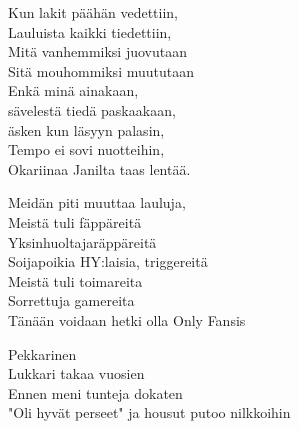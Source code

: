 Kun lakit päähän vedettiin,\\
Lauluista kaikki tiedettiin,\\
Mitä vanhemmiksi juovutaan\\
Sitä mouhommiksi muututaan\\
Enkä minä ainakaan,\\
sävelestä tiedä paskaakaan,\\
äsken kun läsyyn palasin,\\
Tempo ei sovi nuotteihin,\\
Okariinaa Janilta taas lentää.

Meidän piti muuttaa lauluja,\\
Meistä tuli fäppäreitä\\
Yksinhuoltajaräppäreitä\\
Soijapoikia HY:laisia, triggereitä\\
Meistä tuli toimareita\\
Sorrettuja gamereita\\
Tänään voidaan hetki olla Only Fansis

Pekkarinen\\
Lukkari takaa vuosien\\
Ennen meni tunteja dokaten\\
"Oli hyvät perseet" ja housut putoo nilkkoihin